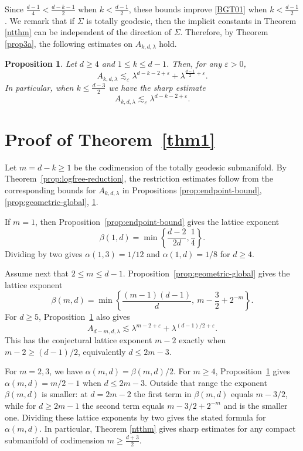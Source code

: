 \documentclass[11pt,reqno]{amsart}
\newtheorem{proposition}[theorem]{Proposition}
\numberwithin{equation}{section}
\newcommand{\1}{\textbf{1}}
\newcommand{\ls}{\lesssim}
\newcommand{\eps}{\varepsilon}
\newcommand{\la}{\lambda}
\begin{document}
	Since $\frac{d-1}4<\frac{d-k-1}2$ when $k<\frac{d-1}2$, these bounds improve \eqref{BGT01} when $k<\frac{d-1}2$. We remark that if $\Sigma$ is totally geodesic, then the implicit constants in Theorem \ref{ntthm} can be independent of the direction of $\Sigma$. Therefore, by Theorem \ref{prop3a}, the following estimates on $A_{k,d,\la}$ hold.
	\begin{proposition}\label{prop:circle-band}
		Let \(d\ge4\) and $1\le k\le d-1$.  Then, for any
		\(\eps>0\),
		\[
		A_{k,d,\la}\ls_{\eps}
		\la^{d-k-2+\eps}+\la^{\frac{d-1}2+\eps}.
		\]	In particular, when $k\le \frac{d-3}2$ we have the sharp estimate 
		\[A_{k,d,\la}\ls_\eps \la^{d-k-2+\eps}.\]  
	\end{proposition}
	
	
	\section{Proof of Theorem~\ref{thm1}}\label{sec5}
	Let $m=d-k\ge1$ be the codimension of the totally geodesic submanifold. By
	Theorem~\ref{prop:logfree-reduction}, the restriction estimates follow from the
	corresponding bounds for $A_{k,d,\lambda}$ in Propositions \ref{prop:endpoint-bound}, \ref{prop:geometric-global}, \ref{prop:circle-band}.
	
	If $m=1$, then Proposition~\ref{prop:endpoint-bound} gives the
	lattice exponent
	\[
	\beta(1,d)=\min\left\{\frac{d-2}{2d},\frac14\right\}.
	\]
	Dividing by two gives $\alpha(1,3)=1/12$ and $\alpha(1,d)=1/8$ for $d\ge4$.
	
	Assume next that $2\le m\le d-1$. Proposition~\ref{prop:geometric-global}
	gives the lattice exponent
	\[
	\beta(m,d)=
	\min\left\{\frac{(m-1)(d-1)}d,\ m-\frac32+2^{-m}\right\}.
	\]
	For $d\ge5$, Proposition~\ref{prop:circle-band} also gives
	\[
	A_{d-m,d,\lambda}
	\ls \lambda^{m-2+\eps}+\lambda^{(d-1)/2+\eps}.
	\]
	This has the conjectural lattice exponent $m-2$ exactly when
	$m-2\ge (d-1)/2$, equivalently $d\le 2m-3$.
	
	For $m=2,3$,  we have $\alpha(m,d)=\beta(m,d)/2$. For
	$m\ge4$, Proposition~\ref{prop:circle-band} gives $\alpha(m,d)=m/2-1$ when $d\le 2m-3$.
	Outside that range the exponent $\beta(m,d)$ is smaller: at $d=2m-2$ the first
	term in $\beta(m,d)$ equals $m-3/2$, while for $d\ge2m-1$ the second
	term equals $m-3/2+2^{-m}$ and is the smaller one. Dividing these lattice
	exponents by two gives the stated formula for $\alpha(m,d)$. 
	In particular, Theorem \ref{ntthm} gives sharp estimates for any compact submanifold of codimension $m\ge \frac{d+3}2$. 
	
\end{document}
